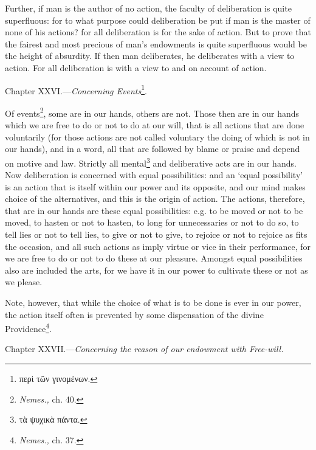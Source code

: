Further, if man is the author of no action, the faculty of deliberation is quite superfluous: for to what purpose could deliberation be put if man is the master of none of his actions? for all deliberation is for the sake of action. But to prove that the fairest and most precious of man’s endowments is quite superfluous would be the height of absurdity. If then man deliberates, he deliberates with a view to action. For all deliberation is with a view to and on account of action.


Chapter XXVI.—\emph{Concerning Events}\footnote{\textgreek{περὶ τῶν γινομένων}.}.

Of events\footnote{\emph{Nemes.,} ch. 40.}, some are in our hands, others are not. Those then are in our hands which we are free to do or not to do at our will, that is all actions that are done voluntarily (for those actions are not called voluntary the doing of which is not in our hands), and in a word, all that are followed by blame or praise and depend on motive and law. Strictly all mental\footnote{\textgreek{τὰ ψυχικὰ πάντα}.} and deliberative acts are in our hands. Now deliberation is concerned with equal possibilities: and an ‘equal possibility’ is an action that is itself within our power and its opposite, and our mind makes choice of the alternatives, and this is the origin of action. The actions, therefore, that are in our hands are these equal possibilities: e.g. to be moved or not to be moved, to hasten or not to hasten, to long for unnecessaries or not to do so, to tell lies or not to tell lies, to give or not to give, to rejoice or not to rejoice as fits the occasion, and all such actions as imply virtue or vice in their performance, for we are free to do or not to do these at our pleasure. Amongst equal possibilities also are included the arts, for we have it in our power to cultivate these or not as we please.

Note, however, that while the choice of what is to be done is ever in our power, the action itself often is prevented by some dispensation of the divine Providence\footnote{\emph{Nemes.,} ch. 37.}.


Chapter XXVII.—\emph{Concerning the reason of our endowment with Free-will.}

